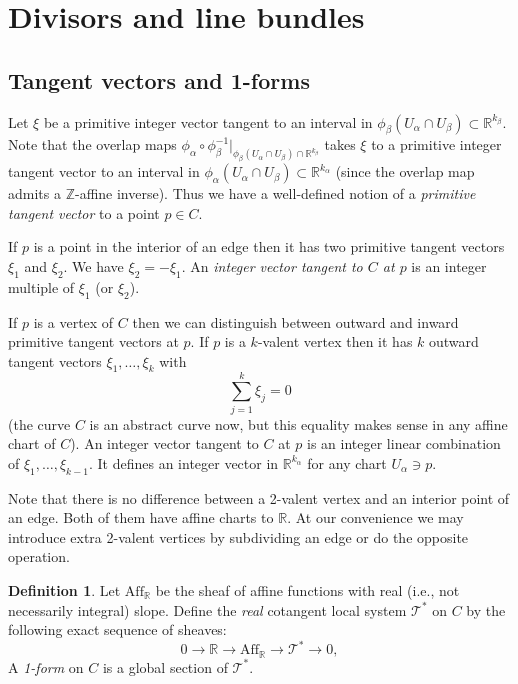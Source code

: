 \documentclass[12pt]{amsart}
\theoremstyle{plain}
\theoremstyle{definition}
\newtheorem{definition}[theorem]{Definition}
\theoremstyle{remark}
\newcommand{\Z}{\mathbb Z}    %
\newcommand{\R}{\mathbb R}    %
\newcommand{\Aff}{\operatorname{Af{}f}}
\newcommand{\<}{\langle}   %
\renewcommand{\>}{\rangle} %
\begin{document}
\section{Divisors and line bundles}

\subsection{Tangent vectors and 1-forms}

Let $\xi$ be a primitive integer vector tangent
to an interval in $\phi_\beta(U_\alpha\cap U_\beta)\subset\R^{k_\beta}$.
Note that the overlap maps $\phi_\alpha\circ\phi_\beta^{-1}
|_{\phi_\beta(U_\alpha\cap U_\beta)\cap\R^{k_\beta}}$
takes $\xi$ to a primitive integer tangent vector
to an interval in $\phi_\alpha(U_\alpha\cap U_\beta)\subset\R^{k_\alpha}$
(since the overlap map admits a $\Z$-affine inverse).
Thus we have a well-defined notion of a {\em primitive tangent
vector} to a point $p\in C$.

If $p$ is a point in the interior of an edge then it has two
primitive tangent vectors $\xi_1$ and $\xi_2$. We have $\xi_2=-\xi_1$.
An {\em integer vector tangent to $C$ at $p$} is
an integer multiple of $\xi_1$ (or $\xi_2$).

If $p$ is a vertex of $C$ then we can distinguish between outward
and inward primitive tangent vectors at $p$. If $p$ is a $k$-valent
vertex then it has $k$ outward tangent vectors $\xi_1,\dots,\xi_k$
with $$\sum_{j=1}^k\xi_j=0$$ (the curve $C$ is an abstract
curve now, but this equality makes sense in any affine chart of $C$). An integer
vector tangent to $C$ at $p$ is an integer linear combination of
$\xi_1,\dots,\xi_{k-1}$. It defines an integer vector in
$\R^{k_\alpha}$ for any chart $U_\alpha\ni p$.

Note that there is no difference between a 2-valent vertex
and an interior point of an edge. Both of them have affine
charts to $\R$. At our convenience we may introduce extra
2-valent vertices by subdividing an edge or do the opposite
operation.

\begin{definition}
Let $\Aff_\R$ be the sheaf of affine functions with real (i.e., not
necessarily integral) slope. Define the {\em real} cotangent local system
${\mathcal T}^*$ on $C$ by the following exact sequence of sheaves:
\begin{equation*}
0 \longrightarrow \R  \longrightarrow \Aff_\R \longrightarrow {\mathcal T}^*\longrightarrow
0,
\end{equation*}
A {\em 1-form} on $C$ is a global section of ${\mathcal T}^*$.
\end{definition}
\end{document}
